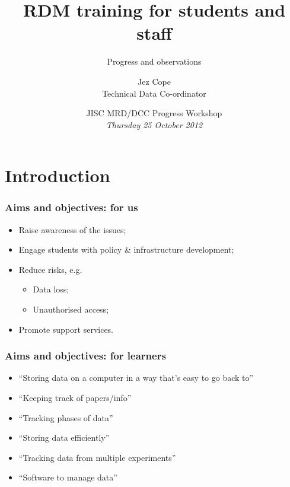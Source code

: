\documentclass[handout]{beamer}
\title{RDM training for students and staff}
\subtitle{Progress and observations}
\author[Jez Cope]{Jez Cope\\ Technical Data Co-ordinator}
\institute[Bath]{Centre for Sustainable Chemical Technologies\\ University of Bath}
\date[25 October 2012]{JISC MRD/DCC Progress Workshop\\ \textit{Thursday 25 October 2012}}
\begin{document}

\begin{frame}[plain]
  \titlepage
\end{frame}

\begin{frame}
  \tableofcontents
\end{frame}

\section{Introduction}

\begin{frame}
  \frametitle{Aims and objectives: for us}
  
  \begin{itemize}[<+>]
    \item Raise awareness of the issues;
    \item Engage students with policy \& infrastructure development;
    \item Reduce risks, e.g.
      \begin{itemize}[<.>]
        \item Data loss;
        \item Unauthorised access;
      \end{itemize}
    \item Promote support services.
  \end{itemize}

\end{frame}

\begin{frame}
  \frametitle{Aims and objectives: for learners}
  
  \begin{itemize}[<+>]
    \item ``Storing data on a computer in a way that's easy to go back to''
    \item ``Keeping track of papers/info''
    \item ``Tracking phases of data''
    \item ``Storing data efficiently''
    \item ``Tracking data from multiple experiments''
    \item ``Software to manage data''
  \end{itemize}

\end{frame}
\end{document}
